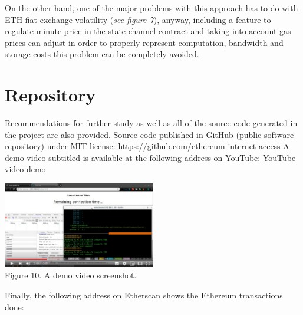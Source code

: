\documentclass[12pt]{amsart}
\begin{document}
\begin{multicols}{2}
\vspace{0.35cm}

On the other hand, one of the major problems with this approach has to do
with ETH-fiat exchange volatility
(\textit{see figure 7}), anyway, including
a feature to regulate minute price in the state channel
contract and taking into account gas prices can adjust
in order to properly
represent computation, bandwidth and storage costs this
problem can be completely avoided.

\section{Repository}\label{sec:repository}

\vspace{0.35cm}

Recommendations for further study as well as all of the source code generated in the project are also provided.
\newline\newline
Source code published in GitHub (public software repository) under MIT license:
\newline\newline
\href{https://github.com/ethereum-internet-access}{https://github.com/ethereum-internet-access}
\newline\newline
A demo video subtitled is available at the following address on YouTube:
\newline\newline
\href{https://www.youtube.com/watch?v=C9pVMn-pu_8&hd=1}{YouTube video demo}


\begin{center}
  \includegraphics[keepaspectratio, width=0.5\textwidth]{images/maxresdefault.eps}
\\
Figure 10. A demo video screenshot.
\\
\end{center}
\vspace{0.15cm}
Finally, the following address on Etherscan shows the Ethereum transactions done:
\newline\newline


\end{multicols}
\end{document}
